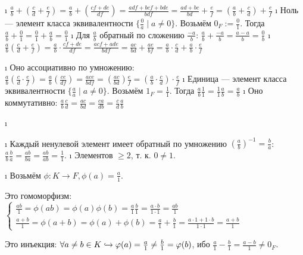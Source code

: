 \begin{solution}
\begin{enumerate}
\begin{itemize}
    \begin{itemize}
    \tightlist
    \i
      \(\frac{a}{b} + (\frac{c}{d} + \frac{e}{f}) = \frac{a}{b} + (\frac{cf+de}{df}) = \frac{adf+bcf+bde}{bdf} = \frac{ad+bc}{bd}+\frac{e}{f} = (\frac{a}{b} + \frac{c}{d}) + \frac{e}{f}\)
    \i
      Ноль --- элемент класса эквивалентности \(\{\frac{0}{a} \mid a \ne 0\}\). Возьмём \(0_F := \frac{0}{1}\). Тогда \(\frac{a}{b} + \frac{0}{1} = \frac{0}{1} + \frac{a}{b} = \frac{0}{1}\)
    \i
      Для \(\frac{a}{b}\) обратный по сложению \(\frac{-a}{b}\): \(\frac{a}{b}+\frac{-a}{b} = \frac{a-a}{b} = \frac{0}{b}\)
    \i
      \(\frac{a}{b} (\frac{c}{d} + \frac{e}{f}) = \frac{a}{b} \cdot \frac{cf+de}{df} = \frac{acf+ade}{bdf} = \frac{ac}{bd}+\frac{ae}{bf} = \frac{a}{b}\cdot \frac{c}{d}+\frac{a}{b} \cdot \frac{e}{f}\)
    \end{itemize}
  \i
    Оно ассоциативно по умножению: \(\frac{a}{b} (\frac{c}{d} \cdot \frac{e}{f}) = \frac{a}{b} (\frac{ce}{df} ) = \frac{ace}{bdf} = (\frac{ac}{bd}) \frac{e}{f} = (\frac{a}{b} \cdot \frac{c}{d}) \cdot \frac{e}{f}\)
  \i
    Единица --- элемент класса эквивалентности \(\{\frac{a}{a} \mid a \ne 0\}\). Возьмём \(1_F = \frac{1}{1}\). Тогда \(\frac{a}{b} \frac{1}{1} = \frac{1}{1} \frac{a}{b} = \frac{a}{b}\)
  \i
    Оно коммутативно: \(\frac{a}{b} \frac{c}{d} = \frac{ac}{bd} = \frac{ca}{db} = \frac{c}{d} \frac{a}{b}\)
  \end{itemize}
\i
  \begin{itemize}
  \tightlist
  \i
    Каждый ненулевой элемент имеет обратный по умножению \((\frac{a}{b})^{-1} = \frac{b}{a}\): \(\frac{a}{b} \frac{b}{a} = \frac{ab}{ba} = \frac{ab}{ab} = \frac{1}{1}\).
  \i
    Элементов \(\ge 2\), т. к. \(0 \ne 1\).
  \end{itemize}
\i
  Возьмём \(\phi: K \to F, \phi(a) = \frac{a}{1}\).

  Это гомоморфизм: 
  $\begin{cases} 
    \frac{ab}{1} = \phi(ab) = \phi(a)\phi(b) = \frac{a}{1}\frac{b}{1} = \frac{a\cdot b}{1\cdot 1} = \frac{ab}{1}\\
    \frac{a+b}{1} = \phi(a+b) = \phi(a)+\phi(b) = \frac{a}{1}+\frac{b}{1} = \frac{a\cdot 1+1 \cdot b}{1\cdot 1} = \frac{a+b}{1}
  \end{cases}$

  Это инъекция: \(\forall a \ne b \in K \hookrightarrow \varphi(a) = \frac{a}{1} \ne \frac{b}{1} = \varphi(b)\), ибо \(\frac{a}{1} - \frac{b}{1} = \frac{a-b}{1} \ne 0_F\).
\end{enumerate}

\end{solution}


